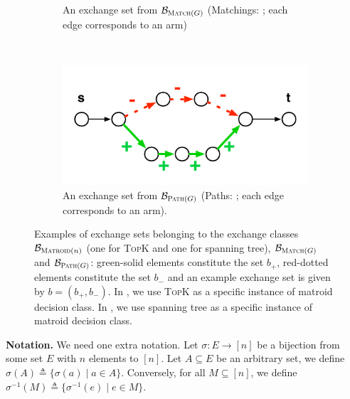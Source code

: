 \documentclass{article}
\newcommand{\B}{\mathcal B}
\newcommand{\MultiIdent}{\textsc{TopK}\xspace}
\newcommand{\Matroid}{\textsc{Matroid}\xspace}
\newcommand{\Match}{\textsc{Match}\xspace}
\newcommand{\Path}{\textsc{Path}\xspace}
\begin{document}
\begin{figure}[ht]
\begin{subfigure}[c]{0.45\textwidth}
	\caption{An exchange set from $\B_{\Match(G)}$ (Matchings: ; each edge corresponds to an arm) }
\end{subfigure}
~
\begin{subfigure}[c]{0.45\textwidth}
	\includegraphics[width=\textwidth]{fig/exchange-path}
	\caption{An exchange set from $\B_{\Path(G)}$ (Paths: ; each edge corresponds to an arm).}
\end{subfigure}
\caption{
Examples of exchange sets belonging to the exchange classes $\B_{\Matroid(n)}$ (one for \MultiIdent and one for spanning tree), $\B_{\Match(G)}$ and $\B_{\Path(G)}$:
green-solid elements constitute the set $b_+$, red-dotted elements constitute the set $b_-$ and an example exchange set is given by $b=(b_+,b_-)$. 
In , we use \MultiIdent as a specific instance of matroid decision class.
In , we use spanning tree as a specific instance of matroid decision class.
}
\label{fig:exchange}
\end{figure}

\textbf{Notation.} We need one extra notation.
Let $\sigma: E\rightarrow [n]$ be a bijection from some set $E$ with $n$ elements to $[n]$.
Let $A\subseteq E$ be an arbitrary set, we define $\sigma(A) \triangleq \{\sigma(a) \mid  a\in A\}$.
Conversely, for all $M\subseteq[n]$, we define $\sigma^{-1}(M) \triangleq \{\sigma^{-1}(e) \mid e\in M\}$.
\end{document}
